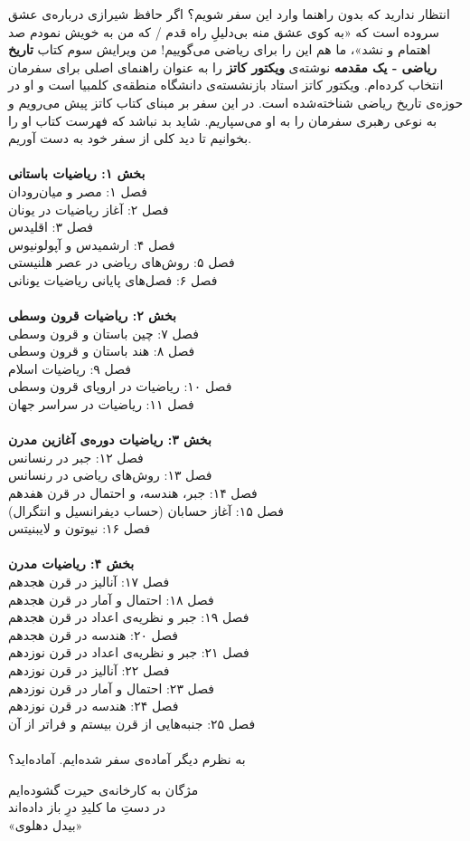 انتظار ندارید که بدون راهنما وارد این سفر شویم؟ اگر حافظ شیرازی درباره‌ی عشق سروده است که «به کوی عشق منه بی‌دلیلِ راه قدم / که من به خویش نمودم صد اهتمام و نشد»، ما هم این را برای ریاضی می‌گوییم! من ویرایش سوم کتاب
\textbf{تاریخ ریاضی - یک مقدمه}%
نوشته‌ی
\textbf{ویکتور کاتز}%
را به عنوان راهنمای اصلی برای سفرمان انتخاب کرده‌ام. ویکتور کاتز استاد بازنشسته‌ی دانشگاه منطقه‌ی کلمبیا%
است و او در حوزه‌ی تاریخ ریاضی شناخته‌شده است. در این سفر بر مبنای کتاب کاتز پیش می‌رویم و به نوعی رهبری سفرمان را به او می‌سپاریم. شاید بد نباشد که فهرست کتاب او را بخوانیم تا دید کلی از سفر خود به دست آوریم.
\\
\\
\textbf{بخش ۱: ریاضیات باستانی}
\\ فصل ۱: مصر و میان‌رودان
\\ فصل ۲: آغاز ریاضیات در یونان
\\ فصل ۳: اقلیدس
\\ فصل ۴: ارشمیدس و آپولونیوس
\\ فصل ۵: روش‌های ریاضی در عصر هلنیستی
\\ فصل ۶: فصل‌های پایانی ریاضیات یونانی
\\
\\
\textbf{بخش ۲: ریاضیات قرون وسطی}
\\ فصل ۷: چین باستان و قرون وسطی
\\ فصل ۸: هند باستان و قرون وسطی
\\ فصل ۹: ریاضیات اسلام
\\ فصل ۱۰: ریاضیات در اروپای قرون وسطی
\\ فصل ۱۱: ریاضیات در سراسر جهان
\\
\\
\textbf{بخش ۳: ریاضیات دوره‌ی آغازین مدرن}%
\\ فصل ۱۲: جبر در رنسانس
\\ فصل ۱۳: روش‌های ریاضی در رنسانس
\\ فصل ۱۴: جبر، هندسه، و احتمال در قرن هفدهم
\\ فصل ۱۵: آغاز حسابان (حساب دیفرانسیل و انتگرال)
\\ فصل ۱۶: نیوتون و لایبنیتس
\\
\\
\textbf{بخش ۴: ریاضیات مدرن}
\\ فصل ۱۷: آنالیز در قرن هجدهم
\\ فصل ۱۸: احتمال و آمار در قرن هجدهم
\\ فصل ۱۹: جبر و نظریه‌ی اعداد در قرن هجدهم
\\ فصل ۲۰: هندسه در قرن هجدهم
\\ فصل ۲۱: جبر و نظریه‌ی اعداد در قرن نوزدهم
\\ فصل ۲۲: آنالیز در قرن نوزدهم
\\ فصل ۲۳: احتمال و آمار در قرن نوزدهم
\\ فصل ۲۴: هندسه در قرن نوزدهم
\\ فصل ۲۵: جنبه‌هایی از قرن بیستم و فراتر از آن
\\
\\
به نظرم دیگر آماده‌ی سفر شده‌ایم. آماده‌اید؟



\begin{flushleft}
	{\lotus
	مژگان به کارخانه‌ی حیرت گشوده‌ایم \\
	در دستِ ما کلیدِ درِ باز داده‌اند \\
	«بیدل دهلوی»
}
\end{flushleft}